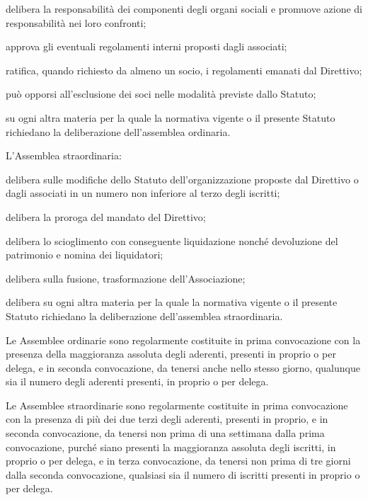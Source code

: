 \documentclass[legalpaper, 11pt]{exam}
\let\tempone\enumerate
\let\temptwo\endenumerate
\renewenvironment{enumerate}{\tempone\addtolength{\itemsep}{-0.45\baselineskip}}{\temptwo}
\begin{document}
{\begin{enumerate}
\begin{enumerate}
  \item delibera la responsabilità dei componenti degli organi sociali e promuove azione di responsabilità nei loro confronti;
  \item approva gli eventuali regolamenti interni proposti dagli associati;
  \item ratifica, quando richiesto da almeno un socio, i regolamenti emanati dal Direttivo;
  \item può opporsi all’esclusione dei soci nelle modalità previste dallo Statuto;
  \item su ogni altra materia per la quale la normativa vigente o il presente Statuto richiedano la deliberazione dell'assemblea ordinaria.
 \end{enumerate}
 \item L'Assemblea straordinaria:
 \vspace{-5pt}
 \begin{enumerate}
  \item delibera sulle modifiche dello Statuto dell’organizzazione proposte dal Direttivo o dagli associati in un numero non inferiore al terzo degli iscritti;
  \item delibera la proroga del mandato del Direttivo;
  \item delibera lo scioglimento con conseguente liquidazione nonché devoluzione del patrimonio e nomina dei liquidatori;
  \item delibera sulla fusione, trasformazione dell’Associazione;
  \item delibera su ogni altra materia per la quale la normativa vigente o il presente Statuto richiedano la deliberazione dell'assemblea straordinaria.
 \end{enumerate}
 \item Le Assemblee ordinarie sono regolarmente costituite in prima convocazione con la presenza della maggioranza assoluta degli aderenti, presenti in proprio o per delega, e in seconda convocazione, da tenersi anche nello stesso giorno, qualunque sia il numero degli aderenti presenti, in proprio o per delega.
 \item Le Assemblee straordinarie sono regolarmente costituite in prima convocazione con la presenza di più dei due terzi degli aderenti, presenti in proprio, e in seconda convocazione, da tenersi non prima di una settimana dalla prima convocazione, purché siano presenti la maggioranza assoluta degli iscritti, in proprio o per delega, e in terza convocazione, da tenersi non prima di tre giorni dalla seconda convocazione, qualsiasi sia il numero di iscritti presenti in proprio o per delega.

\end{enumerate}}
\end{document}
